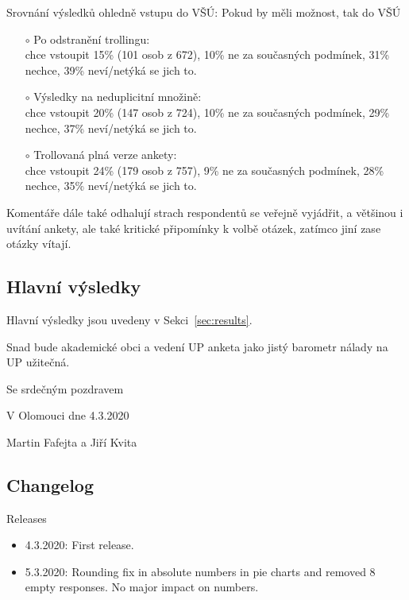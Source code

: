\documentclass[a4paper,twoside]{article}
\begin{document}
\begin{itemize}
{\bf 
  \item Srovnání výsledků ohledně vstupu do VŠÚ: Pokud by měli možnost, tak do VŠÚ
    \begin{itemize}
       \item[$\circ$] Po odstranění trollingu:
       \\  chce vstoupit 15\% (101 osob z 672), 10\% ne za současných podmínek, 31\% nechce, 39\% neví/netýká se jich to.
       \item[$\circ$] Výsledky na neduplicitní množině:
       \\  chce vstoupit 20\% (147 osob z 724), 10\% ne za současných podmínek, 29\% nechce, 37\% neví/netýká se jich to.
       \item[$\circ$] Trollovaná plná verze ankety:
         \\ chce vstoupit 24\% (179 osob z 757), 9\% ne za současných podmínek, 28\% nechce, 35\% neví/netýká se jich to.
    \end{itemize}
}
  \item Komentáře dále také odhalují strach respondentů se veřejně vyjádřit, a většinou i uvítání ankety, ale také kritické připomínky k volbě otázek, zatímco jiní zase otázky vítají.
\end{itemize}

\subsection{Hlavní výsledky}
Hlavní výsledky jsou uvedeny v Sekci~\ref{sec:results}.

\bigskip

\noindent Snad bude akademické obci a vedení UP anketa jako jistý barometr nálady na UP užitečná.

\bigskip

Se srdečným pozdravem

V Olomouci dne 4.3.2020

Martin Fafejta a Jiří Kvita

\subsection{Changelog}
Releases
\begin{itemize}
  \item 4.3.2020: First release.
  \item 5.3.2020: Rounding fix in absolute numbers in pie charts and removed 8 empty responses. No major impact on numbers.
\end{itemize}
\end{document}

